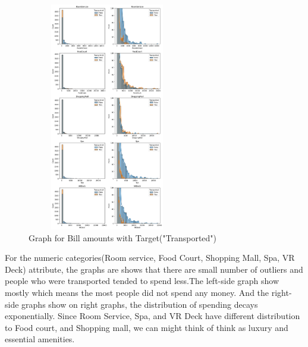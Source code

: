 \documentclass[fleqn,10pt]{SelfArx} %
\begin{document}
\begin{figure}[H]
    \centering
    \includegraphics[width=7cm, height=10cm]{img/numeric.png}
    \caption{Graph for Bill amounts with Target("Transported")}
    \label{fig:my_label}
\end{figure}  
For the numeric categories(Room service, Food Court, Shopping Mall, Spa, VR Deck) attribute, the graphs are shows that there are small number of outliers and people who were transported tended to spend less.The left-side graph show mostly which means the most people did not spend any money. And the right-side graphs show on right graphs, the distribution of spending decays exponentially. Since Room Service, Spa, and VR Deck have different distribution to Food court, and Shopping mall, we can might think of think as luxury and essential amenities.
\end{document}
